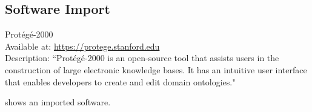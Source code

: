 \subsection{Software Import}

\begin{software}
Prot{\'{e}}g{\'{e}}-2000~\cite{DBLP:conf/amia/NoyCFKTVM03}\\
Available at: \url{https://protege.stanford.edu}\\
Description: ``Prot\'{e}g\'{e}-2000 is an open-source tool that assists users in the construction of large electronic knowledge bases. It has an intuitive user interface that enables developers to create and edit domain ontologies."~\cite{DBLP:conf/amia/NoyCFKTVM03}
\label{software:protege}
\end{software}
 shows an imported software.


